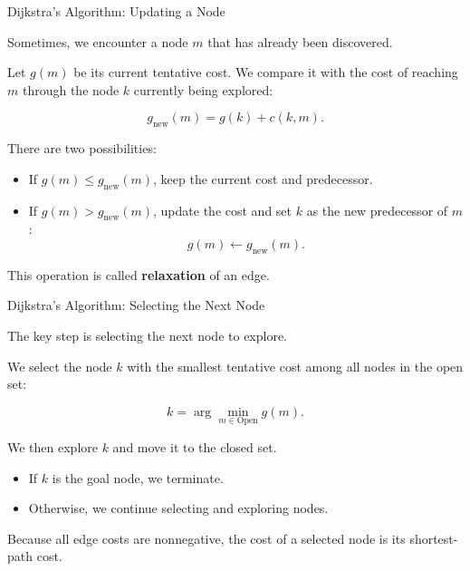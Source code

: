 \documentclass{beamer}
\begin{document}
\begin{frame}{Dijkstra's Algorithm: Updating a Node}
	\begin{flushleft}
		
		Sometimes, we encounter a node $m$ that has
		already been discovered.
		
		Let $g(m)$ be its current tentative cost. We
		compare it with the cost of reaching $m$ through
		the node $k$ currently being explored:
		
		\[
		g_{\mathrm{new}}(m)=g(k)+c(k,m).
		\]
		
		There are two possibilities:
		
		\begin{itemize}
			\item If $g(m)\leq g_{\mathrm{new}}(m)$,
			keep the current cost and predecessor.
			\item If $g(m)>g_{\mathrm{new}}(m)$,
			update the cost and set $k$ as the new
			predecessor of $m$:
			\[
			g(m)\leftarrow g_{\mathrm{new}}(m).
			\]
		\end{itemize}
		
		This operation is called \textbf{relaxation}
		of an edge.
		
	\end{flushleft}
\end{frame}

\begin{frame}{Dijkstra's Algorithm: Selecting the Next Node}
	\begin{flushleft}
		
		The key step is selecting the next node to explore.
		
		We select the node $k$ with the smallest tentative
		cost among all nodes in the open set:
		
		\[
		k=\arg\min_{m\in\mathrm{Open}} g(m).
		\]
		
		We then explore $k$ and move it to the closed set.
		
		\begin{itemize}
			\item If $k$ is the goal node, we terminate.
			\item Otherwise, we continue selecting and
			exploring nodes.
		\end{itemize}
		
		Because all edge costs are nonnegative, the
		cost of a selected node is its shortest-path cost.
		
	\end{flushleft}
\end{frame}
\end{document}
